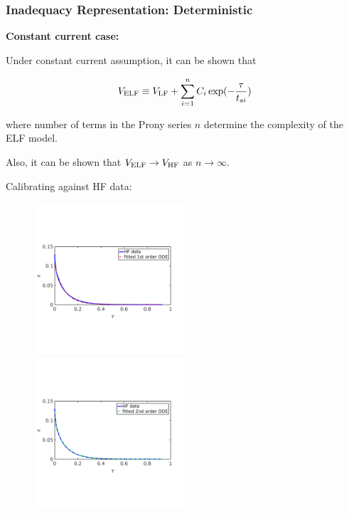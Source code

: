 \documentclass[10pt,xcolor=dvipsnames,compress]{beamer}
\begin{document}
\begin{frame}
\frametitle{Inadequacy Representation: Deterministic}
\vfill


\textbf{Constant current case:}

Under constant current assumption, it can be shown that

\begin{equation*}
V_{\rm ELF}  \equiv V_{\rm LF} + \sum_{i = 1}^n C_i \exp(-\frac{\tau}{t_{si}})
\end{equation*}

where number of terms in the Prony series $n$ determine the complexity of the ELF model.

Also, it can be shown that $V_{\rm ELF} \rightarrow V_{\rm HF}$ as $n \rightarrow \infty$.

Calibrating against HF data:
\begin{figure}
\includegraphics[trim = 0.in 2.4in 0.in 2.8in, clip, width=0.5\textwidth]{figs/Iconst_eps_modelfit_1st.png}
~
\includegraphics[trim = 0.in 2.4in 0.in 2.8in, clip, width=0.5\textwidth]{figs/Iconst_eps_modelfit_2nd.png}
\end{figure}


\vfill
\end{frame}
\end{document}
